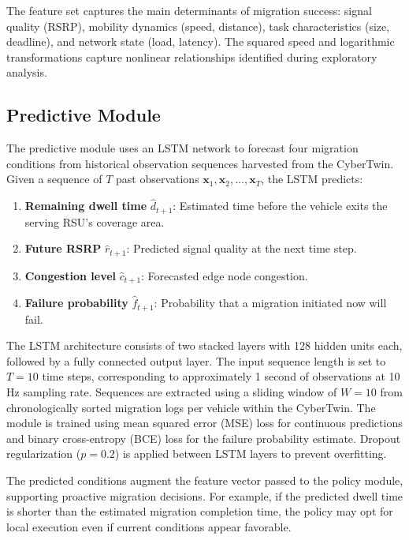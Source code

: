 \documentclass[10pt,letterpaper]{article}
\begin{document}
The feature set captures the main determinants of migration success: signal quality (RSRP), mobility dynamics (speed, distance), task characteristics (size, deadline), and network state (load, latency). The squared speed and logarithmic transformations capture nonlinear relationships identified during exploratory analysis.

\subsection*{Predictive Module}
\label{sec:predictive}

The predictive module uses an LSTM network to forecast four migration conditions from historical observation sequences harvested from the CyberTwin. Given a sequence of $T$ past observations $\mathbf{x}_1, \mathbf{x}_2, \ldots, \mathbf{x}_T$, the LSTM predicts:

\begin{enumerate}
    \item \textbf{Remaining dwell time} $\hat{d}_{t+1}$: Estimated time before the vehicle exits the serving RSU's coverage area.
    \item \textbf{Future RSRP} $\hat{r}_{t+1}$: Predicted signal quality at the next time step.
    \item \textbf{Congestion level} $\hat{c}_{t+1}$: Forecasted edge node congestion.
    \item \textbf{Failure probability} $\hat{f}_{t+1}$: Probability that a migration initiated now will fail.
\end{enumerate}

The LSTM architecture consists of two stacked layers with 128 hidden units each, followed by a fully connected output layer. The input sequence length is set to $T=10$ time steps, corresponding to approximately 1 second of observations at 10\,Hz sampling rate. Sequences are extracted using a sliding window of $W=10$ from chronologically sorted migration logs per vehicle within the CyberTwin. The module is trained using mean squared error (MSE) loss for continuous predictions and binary cross-entropy (BCE) loss for the failure probability estimate. Dropout regularization ($p=0.2$) is applied between LSTM layers to prevent overfitting.

The predicted conditions augment the feature vector passed to the policy module, supporting proactive migration decisions. For example, if the predicted dwell time is shorter than the estimated migration completion time, the policy may opt for local execution even if current conditions appear favorable.
\end{document}
